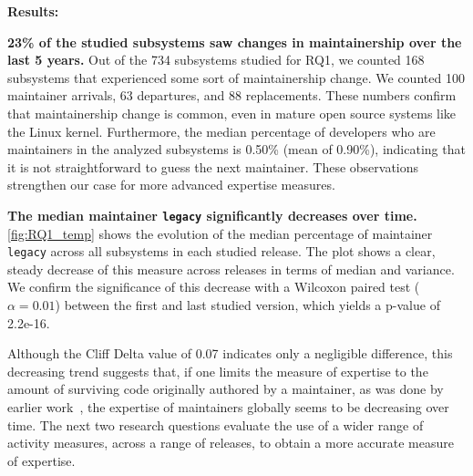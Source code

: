{\bf Results:}

\textbf{23\% of the studied subsystems saw changes in maintainership over the last 5 years.} Out of the 734 subsystems studied for RQ1, we counted 168 subsystems that experienced some sort of maintainership change. We counted 100 maintainer arrivals, 63 departures, and 88 replacements. These numbers confirm that maintainership change is common, even in mature open source systems like the Linux kernel. Furthermore, the median percentage of developers who are maintainers in the analyzed subsystems is 0.50\% (mean of 0.90\%), indicating that it is not straightforward to guess the next maintainer. These observations strengthen our case for more advanced expertise measures.

\textbf{The median maintainer \texttt{legacy} significantly decreases over time.} \autoref{fig:RQ1_temp} shows the evolution of the median percentage of maintainer \texttt{legacy} across all subsystems in each studied release. The plot shows a clear, steady decrease of this measure across releases in terms of median and variance. We confirm the significance of this decrease with a Wilcoxon paired test ($\alpha=0.01$) between the first and last studied version, which yields a p-value of 2.2e-16.%


Although the Cliff Delta value of 0.07 indicates only a negligible difference, this decreasing trend suggests that, if one limits the measure of expertise to the amount of surviving code originally authored by a maintainer, as was done by earlier work~\cite{Rahman-2011}, the expertise of maintainers globally seems to be decreasing over time. The next two research questions evaluate the use of a wider range of activity measures, across a range of releases, to obtain a more accurate measure of expertise.




